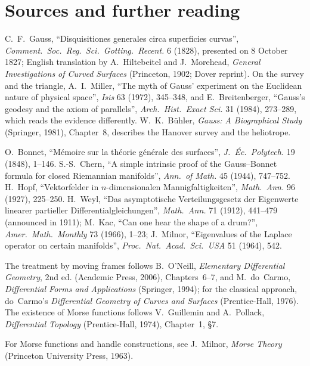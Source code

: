 \section*{Sources and further reading}

C.~F.~Gauss, ``Disquisitiones generales circa superficies curvas'', \emph{Comment.\ Soc.\ Reg.\ Sci.\ Gotting.\ Recent.} 6 (1828), presented on 8 October 1827;
English translation by A.~Hiltebeitel and J.~Morehead, \emph{General Investigations of Curved Surfaces} (Princeton, 1902; Dover reprint). On the survey and the triangle,
A.~I.~Miller, ``The myth of Gauss' experiment on the Euclidean nature of physical space'', \emph{Isis} 63 (1972), 345--348, and E.~Breitenberger, ``Gauss's
geodesy and the axiom of parallels'', \emph{Arch.\ Hist.\ Exact Sci.} 31 (1984), 273--289, which reads the evidence differently. W.~K.~B\"uhler,
\emph{Gauss: A Biographical Study} (Springer, 1981), Chapter~8, describes the Hanover survey and the heliotrope.

O.~Bonnet, ``M\'emoire sur la th\'eorie g\'en\'erale des surfaces'', \emph{J.\ \'Ec.\ Polytech.} 19 (1848), 1--146. S.-S.~Chern, ``A simple intrinsic proof of
the Gauss--Bonnet formula for closed Riemannian manifolds'', \emph{Ann.\ of Math.} 45 (1944), 747--752. H.~Hopf, ``Vektorfelder in $n$-dimensionalen
Mannigfaltigkeiten'', \emph{Math.\ Ann.} 96 (1927), 225--250. H.~Weyl, ``Das asymptotische Verteilungsgesetz der Eigenwerte linearer partieller
Differentialgleichungen'', \emph{Math.\ Ann.} 71 (1912), 441--479 (announced in 1911); M.~Kac, ``Can one hear the shape of a drum?'', \emph{Amer.\ Math.\ Monthly}
73 (1966), 1--23; J.~Milnor, ``Eigenvalues of the Laplace operator on certain manifolds'', \emph{Proc.\ Nat.\ Acad.\ Sci.\ USA} 51 (1964), 542.

The treatment by moving frames follows B.~O'Neill, \emph{Elementary Differential Geometry}, 2nd ed. (Academic Press, 2006), Chapters~6--7, and M.~do~Carmo,
\emph{Differential Forms and Applications} (Springer, 1994); for the classical approach, do~Carmo's \emph{Differential Geometry of Curves and Surfaces}
(Prentice-Hall, 1976). The existence of Morse functions follows V.~Guillemin and A.~Pollack, \emph{Differential Topology} (Prentice-Hall, 1974), Chapter~1, \S7.

For Morse functions and handle constructions, see J.~Milnor, \emph{Morse Theory} (Princeton University Press, 1963).
